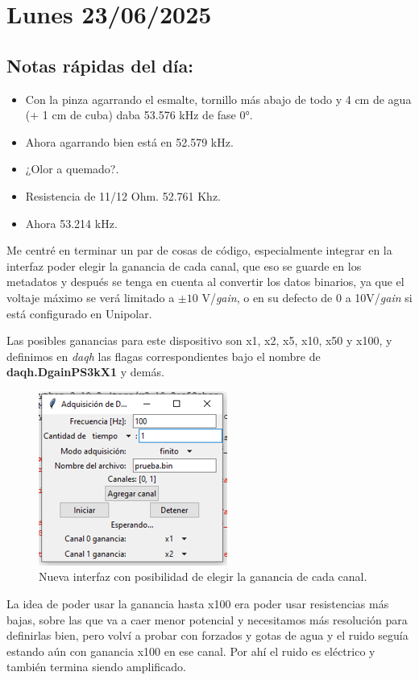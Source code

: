 \section{Lunes 23/06/2025}

\subsection*{Notas rápidas del día:}
\begin{itemize}
	\item Con la pinza agarrando el esmalte, tornillo más abajo de todo y 4 cm de agua (+ 1 cm de cuba) daba 53.576 kHz de fase 0°.
	\item Ahora agarrando bien está en 52.579 kHz.
	\item ¿Olor a quemado?. 
	
	\item Resistencia de 11/12 Ohm. 52.761 Khz.
	\item Ahora 53.214 kHz.
\end{itemize}

Me centré en terminar un par de cosas de código, especialmente integrar en la interfaz poder elegir la ganancia de cada canal, que eso se guarde en los metadatos y después se tenga en cuenta al convertir los datos binarios, ya que el voltaje máximo se verá limitado a $\pm10$ V/\textit{gain}, o en su defecto de 0 a 10V/\textit{gain} si está configurado en Unipolar.

Las posibles ganancias para este dispositivo son x1, x2, x5, x10, x50 y x100, y definimos en \textit{daqh} las flagas correspondientes bajo el nombre de \textbf{daqh.DgainPS3kX1} y demás.

\begin{figure}[th!]
	\centering
	\includegraphics[width=0.27456\linewidth]{Figures/23_06_2025/Ganancias}
	\caption{Nueva interfaz con posibilidad de elegir la ganancia de cada canal.}
	\label{fig:ganancias}
\end{figure}



La idea de poder usar la ganancia hasta x100 era poder usar resistencias más bajas, sobre las que va a caer menor potencial y necesitamos más resolución para definirlas bien, pero volví a probar con forzados y gotas de agua y el ruido seguía estando aún con ganancia x100 en ese canal. Por ahí el ruido es eléctrico y también termina siendo amplificado.

